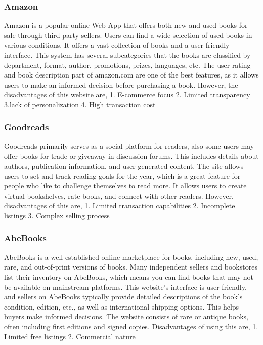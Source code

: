 \documentclass{article}
\begin{document}
\subsubsection{Amazon}
Amazon is a popular online Web-App that offers both new and used books for sale through third-party sellers. Users can find a wide selection of used books in various conditions. It offers a vast collection of books and a user-friendly interface. This system has several subcategories that the books are classified by department, format, author, promotions, prizes, languages, etc. The user rating and book description part of amazon.com are one of the best features, as it allows users to make an informed decision before purchasing a book. 
However, the disadvantages of this website are,
1. E-commerce focus
2. Limited transparency
3.lack of personalization
4. High transaction cost

\subsubsection{Goodreads}
Goodreads primarily serves as a social platform for readers, also some users may offer books for trade or giveaway in discussion forums. This includes details about authors, publication information, and user-generated content. The site allows users to set and track reading goals for the year, which is a great feature for people who like to challenge themselves to read more. It allows users to create virtual bookshelves, rate books, and connect with other readers. However, disadvantages of this are,
1. Limited transaction capabilities
2. Incomplete listings
3. Complex selling process

\subsubsection{AbeBooks}
AbeBooks is a well-established online marketplace for books, including new, used, rare, and out-of-print versions of books. Many independent sellers and bookstores list their inventory on AbeBooks, which means you can find books that may not be available on mainstream platforms. This website's interface is user-friendly, and sellers on AbeBooks typically provide detailed descriptions of the book's condition, edition, etc., as well as international shipping options. This helps buyers make informed decisions. The website consists of rare or antique books, often including first editions and signed copies. Disadvantages of using this are,
1. Limited free listings
2. Commercial nature
\end{document}
